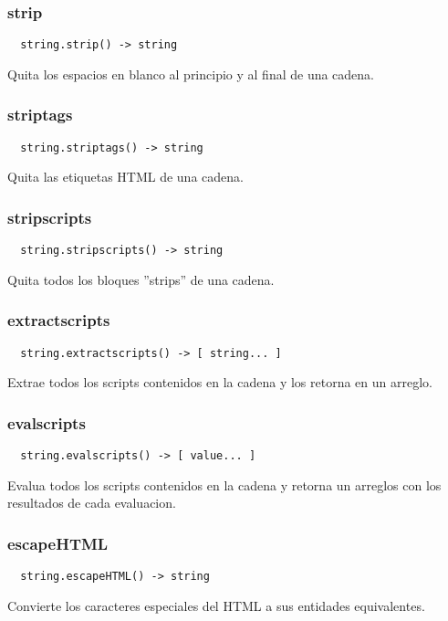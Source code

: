 \subsubsection*{strip}
\begin{verbatim}
  string.strip() -> string
\end{verbatim}
Quita los espacios en blanco al principio y al final de una cadena.

\subsubsection*{striptags}
\begin{verbatim}
  string.striptags() -> string
\end{verbatim}
Quita las etiquetas HTML de una cadena.

\subsubsection*{stripscripts}
\begin{verbatim}
  string.stripscripts() -> string
\end{verbatim}
Quita todos los bloques ''strips'' de una cadena.

\subsubsection*{extractscripts}
\begin{verbatim}
  string.extractscripts() -> [ string... ]
\end{verbatim}
Extrae todos los scripts contenidos en la cadena y los retorna en un arreglo.

\subsubsection*{evalscripts}
\begin{verbatim}
  string.evalscripts() -> [ value... ]
\end{verbatim}
Evalua todos los scripts contenidos en la cadena y retorna un arreglos con los
resultados de cada evaluacion.

\subsubsection*{escapeHTML}
\begin{verbatim}
  string.escapeHTML() -> string
\end{verbatim}
Convierte los caracteres especiales del HTML a sus entidades equivalentes.


